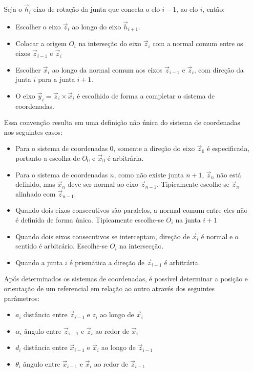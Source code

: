 Seja o $\vec{h}_i$ eixo de rotação da junta que conecta o elo $i-1$, ao elo $i$, então:

\begin{itemize}
\item Escolher o eixo $\vec{z}_i$ ao longo do eixo $\vec{h}_{i+1}$.
\item Colocar a origem $O_i$ na interseção do eixo $\vec{z}_i$ com a normal comum entre os eixos $\vec{z}_{i-1}$ e $\vec{z}_i$
\item Escolher $\vec{x}_i$ ao longo da normal comum aos eixos $\vec{z}_{i-1}$ e $\vec{z}_i$, com direção da junta $i$ para a junta $i+1$. 
\item O eixo $\vec{y}_i = \vec{z}_i \times \vec{x}_i$ é escolhido de forma a completar o sistema de coordenadas.
\end{itemize}

Essa convenção resulta em uma definição não única do sistema de coordenadas nos seguintes casos:

\begin{itemize}
\item Para o sistema de coordenadas $0$, somente a direção do eixo $\vec{z}_0$ é especificada, portanto a escolha de $O_0$ e $ \vec{x}_0$ é arbitrária.
\item Para o sistema de coordenadas $n$, como não existe junta $n+1$, $\vec{z}_n$ não está definido, mas $\vec{x}_n$ deve ser normal ao eixo $\vec{z}_{n-1}$. Tipicamente escolhe-se $\vec{z}_n$ alinhado com $\vec{z}_{n-1}$.
\item Quando dois eixos consecutivos são paralelos, a normal comum entre eles não é definida de forma única. Tipicamente escolhe-se $O_i$ na junta $i+1$
\item  Quando dois eixos consecutivos se interceptam, direção de $\vec{x}_i$ é normal e o sentido é arbitrário. Escolhe-se $O_i$ na intersecção.
\item Quando a junta $i$ é prismática a direção de $\vec{z}_{i-1}$ é arbitrária.
\end{itemize}

Após determinados os sistemas de coordenadas, é possível determinar a posição e orientação de um referencial em relação ao outro através dos seguintes parâmetros:
\begin{itemize}
\item $a_i$ distância entre $\vec{z}_{i-1}$ e $z_i$ ao longo de $\vec{x}_i$
\item $\alpha_i$ ângulo entre $\vec{z}_{i-1}$ e $\vec{z}_i$ ao redor de $\vec{x}_i$
\item $d_i$ distância entre $\vec{x}_{i-1}$ e $\vec{x}_i$ ao longo de $\vec{z}_{i-1}$
\item $\theta_i$ ângulo entre $\vec{x}_{i-1}$ e $\vec{x}_i$ ao redor de $\vec{z}_{i-1}$
\end{itemize}

